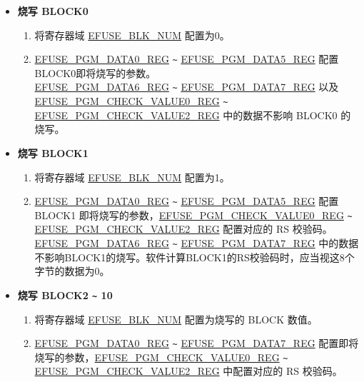 \documentclass[main\_\_CN.tex]{subfiles}
\begin{document}
\begin{itemize}
    \item {\bfseries 烧写 BLOCK0}
    \begin{enumerate}
        \item 将寄存器域 \hyperref[fielddesc:EFUSEBLKNUM]{EFUSE\_BLK\_NUM} 配置为0。
        \item \hyperref[regdesc:EFUSEPGMDATA0REG]{EFUSE\_PGM\_DATA0\_REG} \verb+~+ \hyperref[regdesc:EFUSEPGMDATA1REG]{EFUSE\_PGM\_DATA5\_REG} 配置BLOCK0即将烧写的参数。\\
        \hyperref[regdesc:EFUSEPGMDATA6REG]{EFUSE\_PGM\_DATA6\_REG} \verb+~+ \hyperref[regdesc:EFUSEPGMDATA7REG]{EFUSE\_PGM\_DATA7\_REG} 以及\\ \hyperref[regdesc:EFUSEPGMCHECKVALUE0REG]{EFUSE\_PGM\_CHECK\_VALUE0\_REG} \verb+~+ \hyperref[regdesc:EFUSEPGMCHECKVALUE2REG]{EFUSE\_PGM\_CHECK\_VALUE2\_REG} 中的数据不影响 BLOCK0 的烧写。
    \end{enumerate}
    \item {\bfseries 烧写 BLOCK1}
    \begin{enumerate}
        \item 将寄存器域 \hyperref[fielddesc:EFUSEBLKNUM]{EFUSE\_BLK\_NUM} 配置为1。
        \item \hyperref[regdesc:EFUSEPGMDATA0REG]{EFUSE\_PGM\_DATA0\_REG} \verb+~+ \hyperref[regdesc:EFUSEPGMDATA5REG]{EFUSE\_PGM\_DATA5\_REG} 配置 BLOCK1 即将烧写的参数，\hyperref[regdesc:EFUSEPGMCHECKVALUE0REG]{EFUSE\_PGM\_CHECK\_VALUE0\_REG} \verb+~+ \hyperref[regdesc:EFUSEPGMCHECKVALUE2REG]{EFUSE\_PGM\_CHECK\_VALUE2\_REG} 配置对应的 RS 校验码。\\
        \hyperref[regdesc:EFUSEPGMDATA0REG]{EFUSE\_PGM\_DATA6\_REG} \verb+~+ \hyperref[regdesc:EFUSEPGMDATA5REG]{EFUSE\_PGM\_DATA7\_REG} 中的数据不影响BLOCK1的烧写。软件计算BLOCK1的RS校验码时，应当视这8个字节的数据为0。
    \end{enumerate}
    \item {\bfseries 烧写 BLOCK2 \verb+~+ 10}
    \begin{enumerate}
        \item 将寄存器域 \hyperref[fielddesc:EFUSEBLKNUM]{EFUSE\_BLK\_NUM} 配置为烧写的 BLOCK 数值。
        \item \hyperref[regdesc:EFUSEPGMDATA0REG]{EFUSE\_PGM\_DATA0\_REG} \verb+~+ \hyperref[regdesc:EFUSEPGMDATA7REG]{EFUSE\_PGM\_DATA7\_REG} 配置即将烧写的参数，\hyperref[regdesc:EFUSEPGMCHECKVALUE0REG]{EFUSE\_PGM\_CHECK\_VALUE0\_REG}  \verb+~+ \hyperref[regdesc:EFUSEPGMCHECKVALUE2REG]{EFUSE\_PGM\_CHECK\_VALUE2\_REG} 中配置对应的 RS 校验码。
    \end{enumerate}
\end{itemize}
\end{document}
